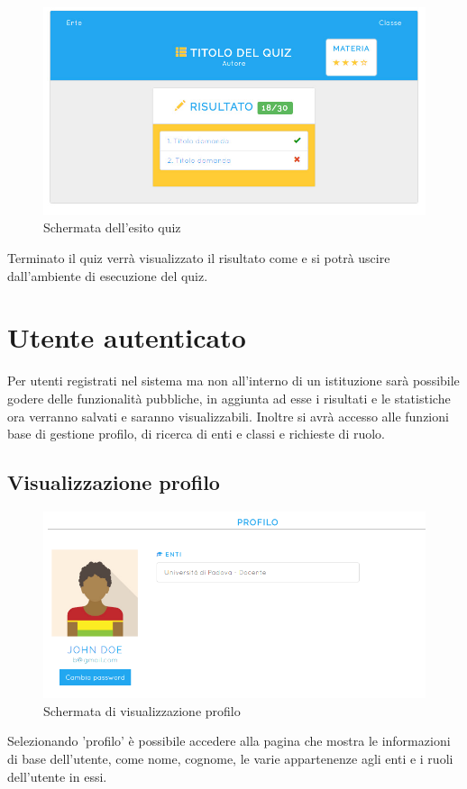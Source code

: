 \documentclass[a4paper, titlepage]{article}
\begin{document}
	 \newpage
	 \begin{figure}[!h]
	 	\centering
	 	\includegraphics[scale=0.33]{Img/screen_EsitoQuiz.png}
	 	\caption{Schermata dell'esito quiz}
	 \end{figure}
	 Terminato il quiz verrà visualizzato il risultato come
	  e si potrà uscire dall'ambiente di esecuzione del quiz.
	 
	 \newpage
	 \section{Utente autenticato}
	 Per utenti registrati nel sistema ma non all'interno di un istituzione sarà possibile godere delle funzionalità pubbliche, in aggiunta ad esse i risultati e le statistiche ora verranno salvati e saranno visualizzabili. Inoltre si avrà accesso alle funzioni base di gestione profilo, di ricerca di enti e classi e richieste di ruolo.

	 \subsection{Visualizzazione profilo}
	 \begin{figure}[!h]
	 	\centering
	 	\includegraphics[scale=0.33]{Img/screen_ProfiloUtente.png}
	 	\caption{Schermata di visualizzazione profilo}
	 \end{figure}
	 Selezionando 'profilo' è possibile accedere alla pagina che mostra le informazioni di base dell'utente, come nome, cognome, le varie appartenenze agli enti e i ruoli dell'utente in essi.
	
\end{document}
